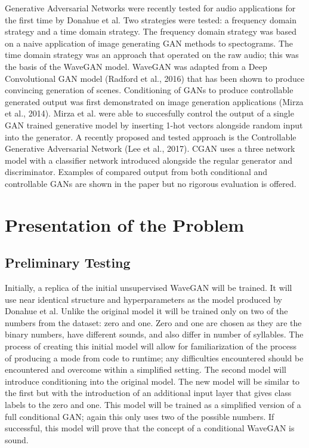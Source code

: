 \documentclass{article}
\begin{document}
Generative Adversarial Networks were recently tested for audio applications for the first time by Donahue et al.
Two strategies were tested: a frequency domain strategy and a time domain strategy.
The frequency domain strategy was based on a naive application of image generating GAN methods to spectograms.
The time domain strategy was an approach that operated on the raw audio; this was the basis of the WaveGAN model.
WaveGAN was adapted from a Deep Convolutional GAN model (Radford et al., 2016) that has been shown to produce convincing generation of scenes.
\newline
\newline
Conditioning of GANs to produce controllable generated output was first demonstrated on image generation applications (Mirza et al., 2014).
Mirza et al. were able to succesfully control the output of a single GAN trained generative model by inserting 1-hot vectors alongside random input into the generator.
\newline
\newline
A recently proposed and tested approach is the Controllable Generative Adversarial Network (Lee et al., 2017).
CGAN uses a three network model with a classifier network introduced alongside the regular generator and discriminator.
Examples of compared output from both conditional and controllable GANs are shown in the paper but no rigorous evaluation is offered.

\section{Presentation of the Problem}

\subsection{Preliminary Testing}

Initially, a replica of the initial unsupervised WaveGAN will be trained.
It will use near identical structure and hyperparameters as the model produced by Donahue et al.
Unlike the original model it will be trained only on two of the numbers from the dataset: zero and one.
Zero and one are chosen as they are the binary numbers, have different sounds, and also differ in number of syllables.
The process of creating this initial model will allow for familiarization of the process of producing a mode from code to runtime; any difficulties encountered should be encountered and overcome within a simplified setting. 
\newline
\newline
The second model will introduce conditioning into the original model.
The new model will be similar to the first but with the introduction of an additional input layer that gives class labels to the zero and one.
This model will be trained as a simplified version of a full conditional GAN; again this only uses two of the possible numbers.
If successful, this model will prove that the concept of a conditional WaveGAN is sound.
\end{document}

